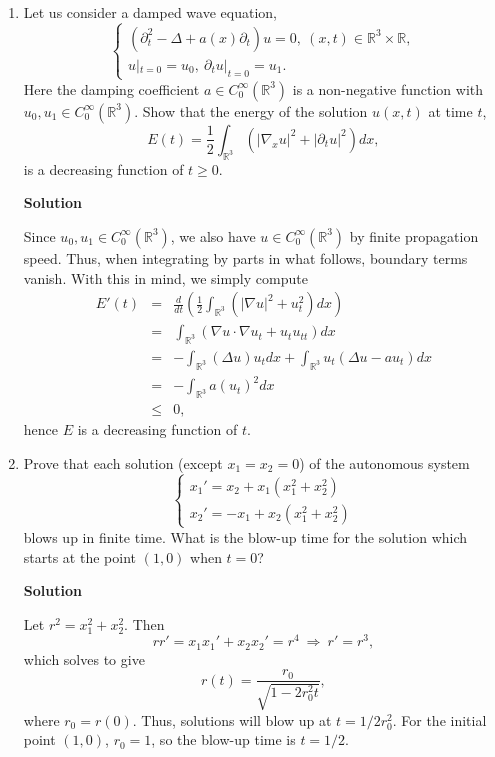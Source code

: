 \documentclass{article}
\begin{document}
\begin{enumerate}
\item Let us consider a damped wave equation,
\[\left\{ \begin{array}{l} (\partial_t^2 - \Delta + a(x) \partial_t) u = 0, \ (x,t) \in \mathbb{R}^3 \times \mathbb{R}, \\
                           u|_{t = 0} = u_0, \ \partial_t u|_{t = 0} = u_1. \end{array} \right.\]
Here the damping coefficient \(a \in C_0^{\infty}(\mathbb{R}^3)\) is a non-negative function with \(u_0, u_1 \in C_0^{\infty}(\mathbb{R}^3)\).  Show that the energy of the solution \(u(x,t)\) at time \(t\),
\[E(t) = \frac{1}{2} \int_{\mathbb{R}^3} \left( |\nabla_x u|^2 + |\partial_t u|^2 \right) dx,\]
is a decreasing function of \(t \geq 0\).

{\bf Solution}

Since \(u_0,u_1 \in C_0^{\infty}(\mathbb{R}^3)\), we also have \(u \in C_0^{\infty}(\mathbb{R}^3)\) by finite propagation speed.  Thus, when integrating by parts in what follows, boundary terms vanish.  With this in mind, we simply compute
\begin{eqnarray*}
E'(t) &   =  & \frac{d}{dt} \left( \frac{1}{2} \int_{\mathbb{R}^3} \left( |\nabla u|^2 + u_t^2 \right) dx \right) \\
      &   =  & \int_{\mathbb{R}^3} \left( \nabla u \cdot \nabla u_t + u_t u_{tt} \right) dx \\
      &   =  & -\int_{\mathbb{R}^3} (\Delta u) u_t dx + \int_{\mathbb{R}^3} u_t \left( \Delta u - a u_t \right) dx \\
      &   =  & -\int_{\mathbb{R}^3} a (u_t)^2 dx \\
      & \leq & 0,
\end{eqnarray*}
hence \(E\) is a decreasing function of \(t\).



\item Prove that each solution (except \(x_1 = x_2 = 0\)) of the autonomous system
\[\left\{ \begin{array}{l} x_1' = x_2 + x_1 \left( x_1^2 + x_2^2 \right) \\ x_2' = -x_1 + x_2 (x_1^2 + x_2^2) \end{array} \right.\]
blows up in finite time.  What is the blow-up time for the solution which starts at the point \((1,0)\) when \(t = 0\)?

{\bf Solution}

Let \(r^2 = x_1^2 + x_2^2\).  Then
\[r r' = x_1 x_1' + x_2 x_2' = r^4 \ \Rightarrow \ r' = r^3,\]
which solves to give
\[r(t) = \frac{r_0}{\sqrt{1 - 2 r_0^2 t}},\]
where \(r_0 = r(0)\).  Thus, solutions will blow up at \(t = 1 / 2 r_0^2\).  For the initial point \((1,0)\), \(r_0 = 1\), so the blow-up time is \(t = 1/2\).




\end{enumerate}
\end{document}
